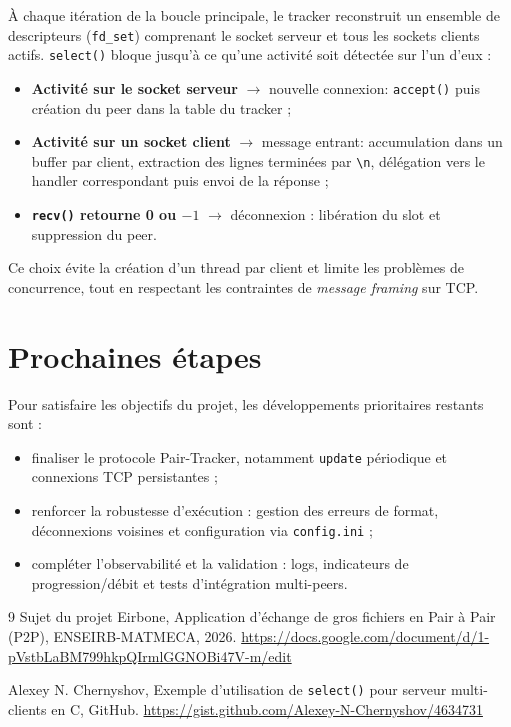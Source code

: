 \documentclass[12pt,a4paper]{article}
\begin{document}
À chaque itération de la boucle principale, le tracker reconstruit un ensemble de descripteurs (\texttt{fd\_set}) comprenant le socket serveur et tous les sockets clients actifs. \texttt{select()} bloque jusqu'à ce qu'une activité soit détectée sur l'un d'eux :

\begin{itemize}
    \item \textbf{Activité sur le socket serveur} $\rightarrow$ nouvelle
    connexion: \texttt{accept()} puis création du peer dans la table du tracker ;

    \item \textbf{Activité sur un socket client} $\rightarrow$ message entrant:
    accumulation dans un buffer par client, extraction des lignes terminées par \texttt{\textbackslash n}, délégation vers le handler correspondant puis envoi de la réponse ;

    \item \textbf{\texttt{recv()} retourne 0 ou $-1$} $\rightarrow$
    déconnexion : libération du slot et suppression du peer.
\end{itemize}

Ce choix évite la création d'un thread par client et limite les problèmes de concurrence, tout en respectant les contraintes de \textit{message framing} sur TCP.

\section{Prochaines étapes}

Pour satisfaire les objectifs du projet, les développements prioritaires restants sont :

\begin{itemize}[leftmargin=1.2cm]
  \item finaliser le protocole Pair-Tracker, notamment \texttt{update} périodique et connexions TCP persistantes ;
  \item renforcer la robustesse d’exécution : gestion des erreurs de format, déconnexions voisines et configuration via \texttt{config.ini} ;
  \item compléter l’observabilité et la validation : logs, indicateurs de progression/débit et tests d’intégration multi-peers.
\end{itemize}

\begin{thebibliography}{9}
Sujet du projet Eirbone,
Application d'échange de gros fichiers en Pair à Pair (P2P),
ENSEIRB-MATMECA, 2026.
\url{https://docs.google.com/document/d/1-pVstbLaBM799hkpQIrmlGGNOBi47V-m/edit}

Alexey N. Chernyshov,
Exemple d'utilisation de \texttt{select()} pour serveur multi-clients en C,
GitHub.
\url{https://gist.github.com/Alexey-N-Chernyshov/4634731}

\end{thebibliography}
\end{document}
